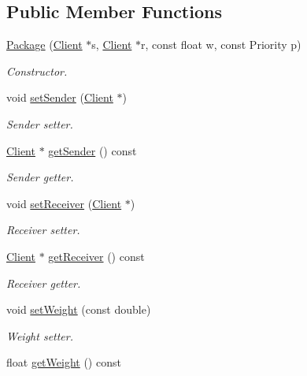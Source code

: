 \subsection*{Public Member Functions}
\begin{DoxyCompactItemize}
\item 
\hyperlink{classPackage_a6f2281022fae8a3a539fc4c37e6fece1}{Package} (\hyperlink{classClient}{Client} $\ast$s, \hyperlink{classClient}{Client} $\ast$r, const float w, const Priority p)
\begin{DoxyCompactList}\small\item\em Constructor. \end{DoxyCompactList}\item 
void \hyperlink{classPackage_a933801e98e91c1d540f9a47926bfc314}{set\+Sender} (\hyperlink{classClient}{Client} $\ast$)
\begin{DoxyCompactList}\small\item\em Sender setter. \end{DoxyCompactList}\item 
\hyperlink{classClient}{Client} $\ast$ \hyperlink{classPackage_a1e603126edbbd5c82c676eb0e6805554}{get\+Sender} () const 
\begin{DoxyCompactList}\small\item\em Sender getter. \end{DoxyCompactList}\item 
void \hyperlink{classPackage_a6a16574423734d7fd0aa4d5a74b0ad32}{set\+Receiver} (\hyperlink{classClient}{Client} $\ast$)
\begin{DoxyCompactList}\small\item\em Receiver setter. \end{DoxyCompactList}\item 
\hyperlink{classClient}{Client} $\ast$ \hyperlink{classPackage_a02e9aee9f9e10b6b6ba124df61bd289d}{get\+Receiver} () const 
\begin{DoxyCompactList}\small\item\em Receiver getter. \end{DoxyCompactList}\item 
void \hyperlink{classPackage_a0766f8a791e0b76d97671cb92d785496}{set\+Weight} (const double)
\begin{DoxyCompactList}\small\item\em Weight setter. \end{DoxyCompactList}\item 
float \hyperlink{classPackage_afc422a740b531fae6a4c4ce543c42be9}{get\+Weight} () const 

\end{DoxyCompactItemize}
